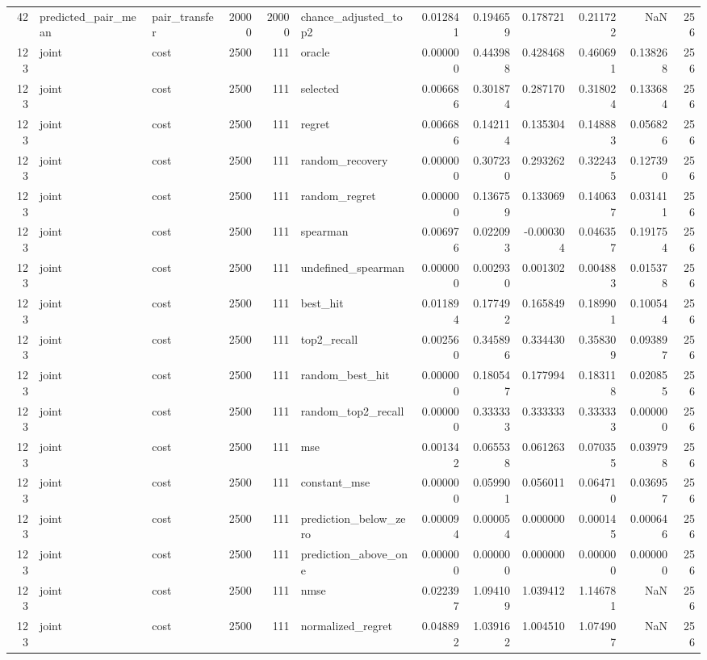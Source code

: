 \begin{tabular}{rllrrlrrrrrr}
42 & predicted_pair_mean & pair_transfer & 20000 & 20000 & chance_adjusted_top2 & 0.012841 & 0.194659 & 0.178721 & 0.211722 & NaN & 256 \\
123 & joint & cost & 2500 & 111 & oracle & 0.000000 & 0.443988 & 0.428468 & 0.460691 & 0.138268 & 256 \\
123 & joint & cost & 2500 & 111 & selected & 0.006686 & 0.301874 & 0.287170 & 0.318024 & 0.133684 & 256 \\
123 & joint & cost & 2500 & 111 & regret & 0.006686 & 0.142114 & 0.135304 & 0.148883 & 0.056826 & 256 \\
123 & joint & cost & 2500 & 111 & random_recovery & 0.000000 & 0.307230 & 0.293262 & 0.322435 & 0.127390 & 256 \\
123 & joint & cost & 2500 & 111 & random_regret & 0.000000 & 0.136759 & 0.133069 & 0.140637 & 0.031411 & 256 \\
123 & joint & cost & 2500 & 111 & spearman & 0.006976 & 0.022093 & -0.000304 & 0.046357 & 0.191754 & 256 \\
123 & joint & cost & 2500 & 111 & undefined_spearman & 0.000000 & 0.002930 & 0.001302 & 0.004883 & 0.015378 & 256 \\
123 & joint & cost & 2500 & 111 & best_hit & 0.011894 & 0.177492 & 0.165849 & 0.189901 & 0.100544 & 256 \\
123 & joint & cost & 2500 & 111 & top2_recall & 0.002560 & 0.345896 & 0.334430 & 0.358309 & 0.093897 & 256 \\
123 & joint & cost & 2500 & 111 & random_best_hit & 0.000000 & 0.180547 & 0.177994 & 0.183118 & 0.020855 & 256 \\
123 & joint & cost & 2500 & 111 & random_top2_recall & 0.000000 & 0.333333 & 0.333333 & 0.333333 & 0.000000 & 256 \\
123 & joint & cost & 2500 & 111 & mse & 0.001342 & 0.065538 & 0.061263 & 0.070355 & 0.039798 & 256 \\
123 & joint & cost & 2500 & 111 & constant_mse & 0.000000 & 0.059901 & 0.056011 & 0.064710 & 0.036957 & 256 \\
123 & joint & cost & 2500 & 111 & prediction_below_zero & 0.000094 & 0.000054 & 0.000000 & 0.000145 & 0.000646 & 256 \\
123 & joint & cost & 2500 & 111 & prediction_above_one & 0.000000 & 0.000000 & 0.000000 & 0.000000 & 0.000000 & 256 \\
123 & joint & cost & 2500 & 111 & nmse & 0.022397 & 1.094109 & 1.039412 & 1.146781 & NaN & 256 \\
123 & joint & cost & 2500 & 111 & normalized_regret & 0.048892 & 1.039162 & 1.004510 & 1.074907 & NaN & 256 \\

\end{tabular}
